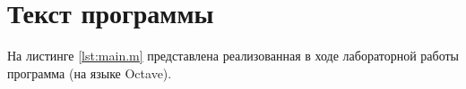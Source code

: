 \chapter{Текст программы}

На листинге \ref{lst:main.m} представлена реализованная в ходе лабораторной работы программа (на языке Octave).

